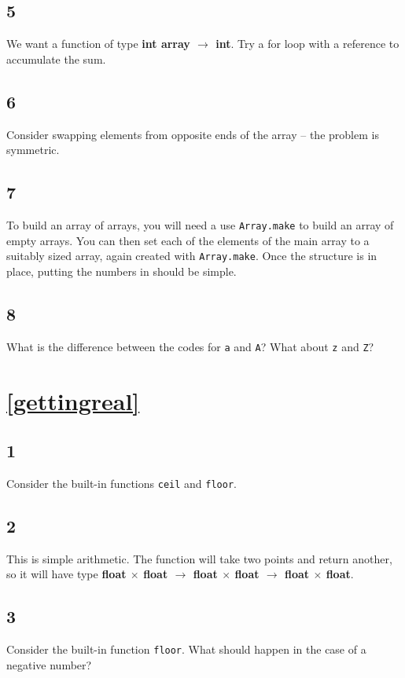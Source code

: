 \documentclass[]{book}
\newcommand\upquote[1]{\textquotesingle#1\textquotesingle}
\begin{document}
\subsection*{5}
We want a function of type \textbf{\textrm{int array $\rightarrow$ int}}. Try a for loop with a reference to accumulate the sum.

\subsection*{6}
Consider swapping elements from opposite ends of the array -- the problem is symmetric.

\subsection*{7}
To build an array of arrays, you will need a use \texttt{Array.make} to build an array of empty arrays. You can then set each of the elements of the main array to a suitably sized array, again created with \texttt{Array.make}. Once the structure is in place, putting the numbers in should be simple.

\subsection*{8}
What is the difference between the codes for \texttt{\upquote{a}} and \texttt{\upquote{A}}? What about \texttt{\upquote{z}} and \texttt{\upquote{Z}}?

\section*{\ref{gettingreal}\\ }
\subsection*{1}
Consider the built-in functions \texttt{ceil} and \texttt{floor}. 

\subsection*{2}
This is simple arithmetic. The function will take two points and return another, so it will have type \textbf{\textrm{float $\times$ float $\rightarrow$ float $\times$ float $\rightarrow$ float $\times$ float}}.

\subsection*{3}
Consider the built-in function \texttt{floor}. What should happen in the case of a negative number?
\end{document}
